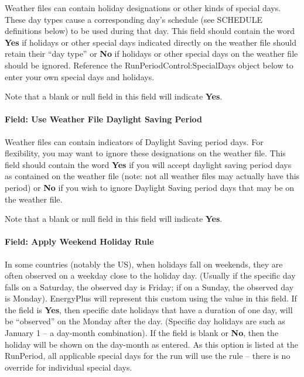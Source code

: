 Weather files can contain holiday designations or other kinds of special days. These day types cause a corresponding day's schedule (see SCHEDULE definitions below) to be used during that day. This field should contain the word \textbf{Yes} if holidays or other special days indicated directly on the weather file should retain their ``day type'' or \textbf{No} if holidays or other special days on the weather file should be ignored. Reference the RunPeriodControl:SpecialDays object below to enter your own special days and holidays.

Note that a blank or null field in this field will indicate \textbf{Yes}.

\paragraph{Field: Use Weather File Daylight Saving Period}\label{field-use-weather-file-daylight-saving-period-2}

Weather files can contain indicators of Daylight Saving period days. For flexibility, you may want to ignore these designations on the weather file. This field should contain the word \textbf{Yes} if you will accept daylight saving period days as contained on the weather file (note: not all weather files may actually have this period) or \textbf{No} if you wish to ignore Daylight Saving period days that may be on the weather file.

Note that a blank or null field in this field will indicate \textbf{Yes}.

\paragraph{Field: Apply Weekend Holiday Rule}\label{field-apply-weekend-holiday-rule}

In some countries (notably the US), when holidays fall on weekends, they are often observed on a weekday close to the holiday day. (Usually if the specific day falls on a Saturday, the observed day is Friday; if on a Sunday, the observed day is Monday). EnergyPlus will represent this custom using the value in this field. If the field is \textbf{Yes}, then specific date holidays that have a duration of one day, will be ``observed'' on the Monday after the day. (Specific day holidays are such as January 1 -- a day-month combination). If the field is blank or \textbf{No}, then the holiday will be shown on the day-month as entered. As this option is listed at the RunPeriod, all applicable special days for the run will use the rule -- there is no override for individual special days.

